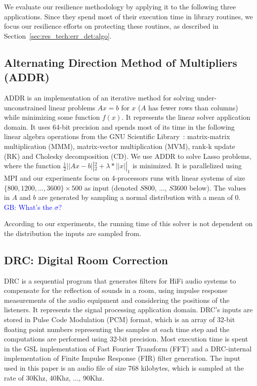 \documentclass[10pt, conference, compsocconf]{IEEEtran}
\newcommand{\greg}[1]{%
  \textcolor{blue}{GB: #1}
}
\begin{document}
We evaluate our resilience methodology by applying it to the following three applications.
Since they spend most of their execution time in library routines, we focus our resilience efforts on protecting these routines, as described in Section~\ref{sec:res_tech:err_det:algo}.

\vspace{-10pt}
\subsection{Alternating Direction Method of Multipliers (ADDR)}
\vspace{-10pt}
\label{sec:apps:lasso}
ADDR is an implementation of an iterative method for solving under-unconstrained linear problems $Ax=b$ for $x$ ($A$ has fewer rows than columns) while minimizing some function $f(x)$.
It represents the linear solver application domain.
It uses 64-bit precision and spends most of its time in the following linear algebra operations from the GNU Scientific Library~\cite{gsl:2011}: matrix-matrix multiplication (MMM), matrix-vector multiplication (MVM), rank-k update (RK) and Cholesky decomposition (CD).
We use ADDR to solve Lasso problems, where the function $\frac{1}{2} \left|| Ax - b \right||_2^2 + \lambda*\left|| x \right||_1$ is minimized.
It is parallelized using MPI and our experiments focus on 4-processors runs with linear systems of size $\{800, 1200, ..., 3600\} \times 500$ as input (denoted $S800$, ..., $S3600$ below).%
The values in $A$ and $b$ are generated by sampling a normal distribution with a mean of 0. \greg{What's the $\sigma$?}
According to our experiments, the running time of this solver is not dependent on the distribution the inputs are sampled from.

\vspace{-10pt}
\subsection{DRC: Digital Room Correction}
\vspace{-10pt}
\label{sec:apps:drc}

DRC is a sequential program that generates filters for HiFi audio systems to compensate for the reflection of sounds in a room, using impulse response measurements of the audio equipment and considering the positions of the listeners.
It represents the signal processing application domain.
DRC's inputs are stored in Pulse Code Modulation (PCM) format, which is an array of 32-bit floating point numbers representing the samples at each time step and the computations are performed using 32-bit precision.
Most execution time is spent in the GSL implementation of Fast Fourier Transform (FFT) and a DRC-internal implementation of Finite Impulse Response (FIR) filter generation.
The input used in this paper is an audio file of size 768 kilobytes, which is sampled at the rate of 30Khz, 40Khz, ..., 90Khz.
\end{document}
